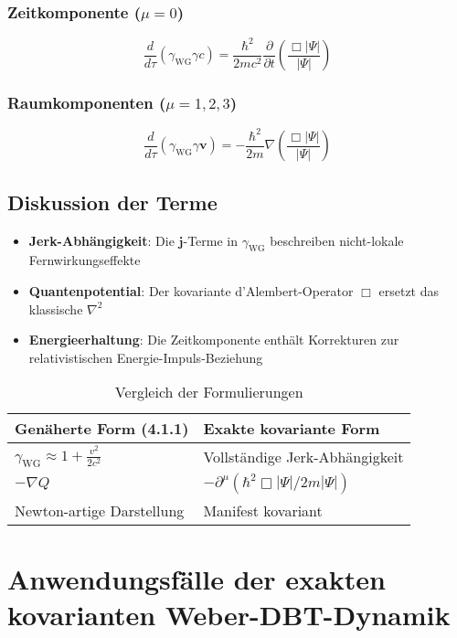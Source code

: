 \subsubsection{Zeitkomponente ($\mu=0$)}
\begin{equation}
\frac{d}{d\tau}\left(\gamma_{\mathrm{WG}}\gamma c\right) = \frac{\hbar^2}{2mc^2}\frac{\partial}{\partial t}\left(\frac{\Box|\Psi|}{|\Psi|}\right)
\end{equation}

\subsubsection{Raumkomponenten ($\mu=1,2,3$)}
\begin{equation}
\frac{d}{d\tau}\left(\gamma_{\mathrm{WG}}\gamma\mathbf{v}\right) = -\frac{\hbar^2}{2m}\nabla\left(\frac{\Box|\Psi|}{|\Psi|}\right)
\end{equation}

\subsection{Diskussion der Terme}
\begin{itemize}
\item \textbf{Jerk-Abhängigkeit}: Die $\mathbf{j}$-Terme in $\gamma_{\mathrm{WG}}$ beschreiben nicht-lokale Fernwirkungseffekte
\item \textbf{Quantenpotential}: Der kovariante d'Alembert-Operator $\Box$ ersetzt das klassische $\nabla^2$
\item \textbf{Energieerhaltung}: Die Zeitkomponente enthält Korrekturen zur relativistischen Energie-Impuls-Beziehung
\end{itemize}

\begin{table}[h]
\centering
\caption{Vergleich der Formulierungen}
\begin{tabular}{ll}
\hline
\textbf{Genäherte Form (4.1.1)} & \textbf{Exakte kovariante Form} \\
\hline
$\gamma_{\mathrm{WG}} \approx 1 + \frac{v^2}{2c^2}$ & Vollständige Jerk-Abhängigkeit \\
$-\nabla Q$ & $-\partial^\mu(\hbar^2\Box|\Psi|/2m|\Psi|)$ \\
Newton-artige Darstellung & Manifest kovariant \\
\hline
\end{tabular}
\end{table}

\section{Anwendungsfälle der exakten kovarianten Weber-DBT-Dynamik}
\label{sec:applications}

